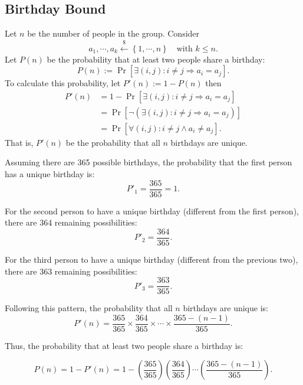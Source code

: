 \documentclass[12pt,openany]{book}
\theoremstyle{definition}
\newcommand{\set}[1]{\left\{#1\right\}}
\newcommand{\of}[1]{\left( #1 \right)}
\newcommand{\dollar}{\$}
\newcommand{\uniform}{\xleftarrow{\dollar}}
\begin{document}
	\subsection{Birthday Bound}
	Let $n$ be the number of people in the group. Consider \[
	a_1,\cdots,a_k\uniform\set{1,\cdots, n}\quad\text{with $k\leq n$}.
	\] Let $P(n)$ be the probability that at least two people share a birthday: \[
	P\of{n}:=\Pr\left[\exists (i,j):i\neq j\Rightarrow a_i=a_j\right].
	\] To calculate this probability, let $P'\of{n}:=1-P\of{n}$ then \begin{align*}
	P'\of{n}&=1-\Pr\left[\exists (i,j):i\neq j\Rightarrow a_i=a_j\right]\\
	&=\Pr\left[\lnot\of{\exists (i,j):i\neq j\Rightarrow a_i=a_j}\right]\\
	&=\Pr\left[\forall(i,j):i\neq j\land a_i\neq a_j\right].
	\end{align*}
	That is, $P' (n)$ be the probability that all $n$ birthdays are unique.
	
	Assuming there are 365 possible birthdays, the probability that the first person has a unique birthday is:
	\begin{equation*}
	P'_1 = \frac{365}{365} = 1.
	\end{equation*}
	
	For the second person to have a unique birthday (different from the first person), there are 364 remaining possibilities:
	\begin{equation*}
	P'_2 = \frac{364}{365}.
	\end{equation*}
	
	For the third person to have a unique birthday (different from the previous two), there are 363 remaining possibilities:
	\begin{equation*}
	P'_3 = \frac{363}{365}.
	\end{equation*}
	
	Following this pattern, the probability that all $n$ birthdays are unique is:
	\begin{equation*}
	P'(n) = \frac{365}{365} \times \frac{364}{365} \times \cdots \times \frac{365 - (n - 1)}{365}.
	\end{equation*}
	
	Thus, the probability that at least two people share a birthday is:
	
	\begin{equation*}
	P(n) = 1 - P'(n)=1-\of{\frac{365}{365}}\of{\frac{364}{365}}\cdots\of{\frac{365-(n-1)}{365}}.
	\end{equation*}
	
\end{document}
